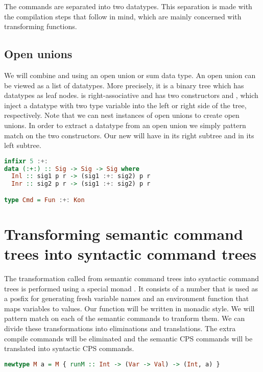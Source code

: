 The commands are separated into two datatypes. This separation is made with the compilation steps that follow in mind, which are mainly concerned with transforming functions.

\subsection{\label{section:openunion}Open unions}
We will combine  and  using an open union or sum data type. An open union can be viewed as a list of datatypes. More precisely, it is a binary tree which has datatypes as leaf nodes. \lstinlineb{:+:} is right-associative and has two constructors  and , which inject a datatype with two type variable into the left or right side of the tree, respectively. Note that we can nest instances of open unions to create open unions. In order to extract a datatype from an open union we simply pattern match on the two constructors. Our new  will have  in its right subtree and  in its left subtree.

\begin{lstlisting}[language=Haskell]
infixr 5 :+:
data (:+:) :: Sig -> Sig -> Sig where
  Inl :: sig1 p r -> (sig1 :+: sig2) p r
  Inr :: sig2 p r -> (sig1 :+: sig2) p r

type Cmd = Fun :+: Kon
\end{lstlisting}


\section{\label{section:semtosyn}Transforming semantic command trees into syntactic command trees}
The transformation called  from semantic command trees into syntactic command trees is performed using a special monad . It consists of a number that is used as a posfix for generating fresh variable names and an environment function that maps variables to values. Our  function will be written in monadic style. We will pattern match on each of the semantic commands to tranform them. We can divide these transformations into eliminations and translations. The extra compile commands will be eliminated and the semantic \ac{CPS} commands will be translated into syntactic \ac{CPS} commands.

\begin{lstlisting}[language=Haskell]
newtype M a = M { runM :: Int -> (Var -> Val) -> (Int, a) }
\end{lstlisting}

